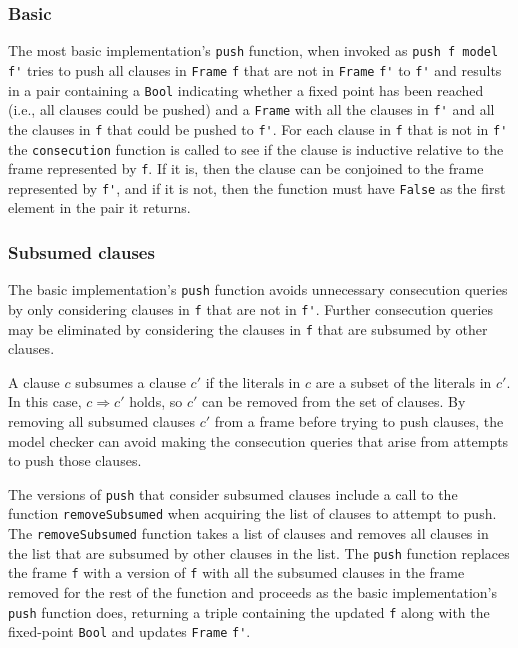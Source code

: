 \documentclass[12pt,a4paper,twoside,openright]{report}
\begin{document}
\subsubsection{Basic}
The most basic implementation's \verb,push, function, when invoked as \verb,push f model f', tries
to push all clauses in \verb,Frame, \verb,f, that are not in \verb,Frame, \verb,f', to \verb,f', and
results in a pair containing a \verb,Bool, indicating whether a fixed point has been reached
(i.e., all clauses could be pushed) and a \verb,Frame, with all the clauses in \verb,f', and all
the clauses in \verb,f, that could be pushed to \verb,f',.
For each clause in \verb,f, that is not in \verb,f', the \verb,consecution, function is called to
see if the clause is inductive relative to the frame represented by \verb,f,. If it is, then
the clause can be conjoined to the frame represented by \verb,f',, and if it is not, then the
function must have \verb,False, as the first element in the pair it returns.

\subsubsection{Subsumed clauses}
The basic implementation's \verb,push, function avoids unnecessary consecution queries by only
considering clauses in \verb,f, that are not in \verb,f',. Further consecution queries may be
eliminated by considering the clauses in \verb,f, that are subsumed by other clauses.

A clause $c$ subsumes a clause $c'$ if the literals in $c$ are a subset of the literals in $c'$.
In this case, $c \Rightarrow c'$ holds, so $c'$ can be removed from the set of clauses. By
removing all subsumed clauses $c'$ from a frame before trying to push clauses, the model
checker can avoid making the consecution queries that arise from attempts to push those clauses.

The versions of \verb,push, that consider subsumed clauses include a call to the function
\verb,removeSubsumed, when acquiring the list of clauses to attempt to push.
The \verb,removeSubsumed, function takes a list of clauses and removes all clauses in the list
that are subsumed by other clauses in the list. The \verb,push, function replaces the frame
\verb,f, with a version of \verb,f, with all the subsumed clauses in the frame removed for
the rest of the function and proceeds as the basic implementation's \verb,push, function does,
returning a triple containing the updated \verb,f, along with the fixed-point \verb,Bool,
and updates \verb,Frame, \verb,f',.
\end{document}
